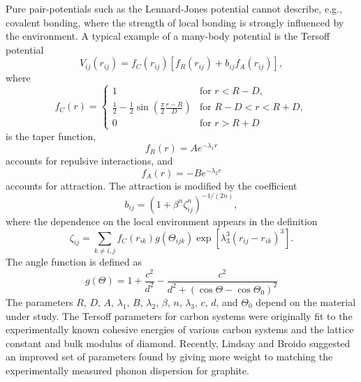 Pure pair-potentials such as the Lennard-Jones potential cannot describe, e.g., covalent bonding, where the strength of local bonding is strongly influenced by the environment. A typical example of a many-body potential is the Tersoff potential
\begin{equation}
 V_{ij}(r_{ij}) = f_C(r_{ij}) \left[f_R(r_{ij}) + b_{ij}f_A(r_{ij}) \right],
\end{equation}
where 
\begin{equation}
 f_C ( r) = \left\{ \begin{array}{ll}
                     1 & \textrm{for } r<R-D,\\
		     \frac{1}{2}-\frac{1}{2}\sin\left(\frac{\pi}{2}\frac{r-R}{D} \right) & \textrm{for } R-D < r < R+D, \\
		     0 & \textrm{for } r>R+D
                    \end{array}
 \right.
\end{equation}
is the taper function, 
\begin{equation}
 f_R(r) = A e^{-\lambda_1 r}
\end{equation}
accounts for repulsive interactions, and
\begin{equation}
 f_A(r) = -B e^{-\lambda_2 r}
\end{equation}
 accounts for attraction. The attraction is modified by the coefficient
\begin{equation}
 b_{ij} = \left( 1+\beta^n \zeta_{ij}^n \right)^{-1/(2n)},
\end{equation}
where the dependence on the local environment appears in the definition 
\begin{equation}
 \zeta_{ij} = \sum_{k\neq i,j} f_C(r_{ik}) g(\Theta_{ijk}) \exp\left[\lambda_3^3(r_{ij}-r_{ik})^3 \right] .
\end{equation}
The angle function is defined as 
\begin{equation}
 g(\Theta) = 1 + \frac{c^2}{d^2} - \frac{c^2}{d^2 + (\cos \Theta-\cos \Theta_0)^2}
\end{equation}
The parameters $R$, $D$, $A$, $\lambda_1$, $B$, $\lambda_2$, $\beta$, $n$, $\lambda_3$, $c$, $d$, and $\Theta_0$ depend on the material under study. The Tersoff parameters for carbon systems were originally fit to the experimentally known cohesive energies of various carbon systems and the lattice constant and bulk modulus of diamond. Recently, Lindsay and Broido suggested an improved set of parameters found by giving more weight to matching the experimentally measured phonon dispersion for graphite. 

